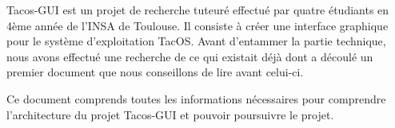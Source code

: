 Tacos-GUI est un projet de recherche tuteuré effectué par quatre étudiants en 4ème année de l'INSA de Toulouse.
Il consiste à créer une interface graphique pour le système d'exploitation TacOS.
Avant d'entammer la partie technique, nous avons effectué une recherche de ce qui existait déjà dont a découlé un premier document que nous conseillons de lire avant celui-ci.

Ce document comprends toutes les informations nécessaires pour comprendre l'architecture du projet Tacos-GUI et pouvoir poursuivre le projet.
